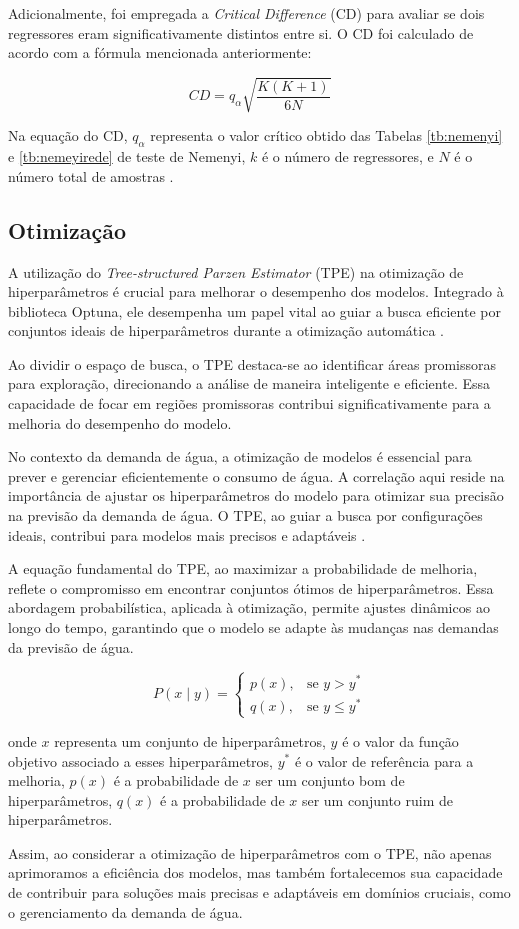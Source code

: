 Adicionalmente, foi empregada a \textit{Critical Difference} (CD) para avaliar se dois regressores eram significativamente distintos entre si. O CD foi calculado de acordo com a fórmula mencionada anteriormente:

\begin{equation}
	CD = q_\alpha \sqrt{\frac{K(K+1)}{6N}}
\end{equation}

\noindent Na equação do CD, $q_\alpha$ representa o valor crítico obtido das Tabelas \ref{tb:nemenyi} e \ref{tb:nemeyirede} de teste de Nemenyi, $k$ é o número de regressores, e $N$ é o número total de amostras \cite{Liu2022}.
 
 
 \subsection{Otimiza\c c\~ao}
 
A utilização do \textit{Tree-structured Parzen Estimator} (TPE) na otimização de hiperparâmetros é crucial para melhorar o desempenho dos modelos. Integrado à biblioteca Optuna, ele desempenha um papel vital ao guiar a busca eficiente por conjuntos ideais de hiperparâmetros durante a otimização automática \cite{tpe}.

Ao dividir o espaço de busca, o TPE destaca-se ao identificar áreas promissoras para exploração, direcionando a análise de maneira inteligente e eficiente. Essa capacidade de focar em regiões promissoras contribui significativamente para a melhoria do desempenho do modelo.

No contexto da demanda de água, a otimização de modelos é essencial para prever e gerenciar eficientemente o consumo de água. A correlação aqui reside na importância de ajustar os hiperparâmetros do modelo para otimizar sua precisão na previsão da demanda de água. O TPE, ao guiar a busca por configurações ideais, contribui para modelos mais precisos e adaptáveis \cite{tpe}.

A equação fundamental do TPE, ao maximizar a probabilidade de melhoria, reflete o compromisso em encontrar conjuntos ótimos de hiperparâmetros. Essa abordagem probabilística, aplicada à otimização, permite ajustes dinâmicos ao longo do tempo, garantindo que o modelo se adapte às mudanças nas demandas da previsão de água.

$$ P(x \mid y) = \begin{cases} 
	p(x), & \text{se } y > y^* \\
	q(x), & \text{se } y \leq y^*
\end{cases} $$

\noindent onde $ x $ representa um conjunto de hiperparâmetros, $ y $ é o valor da função objetivo associado a esses hiperparâmetros, $ y^* $ é o valor de referência para a melhoria, $ p(x) $ é a probabilidade de $ x $ ser um conjunto bom de hiperparâmetros, $ q(x) $ é a probabilidade de $ x $ ser um conjunto ruim de hiperparâmetros.

Assim, ao considerar a otimização de hiperparâmetros com o TPE, não apenas aprimoramos a eficiência dos modelos, mas também fortalecemos sua capacidade de contribuir para soluções mais precisas e adaptáveis em domínios cruciais, como o gerenciamento da demanda de água.
